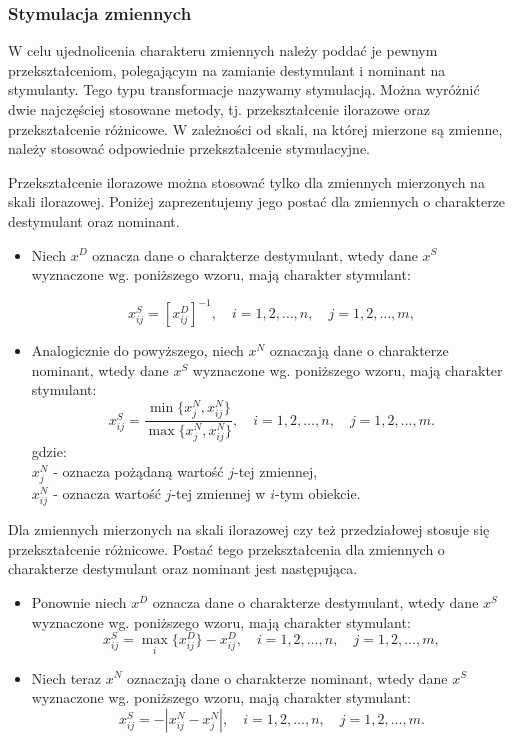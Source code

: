\documentclass[12pt,a4paper]{report}
\begin{document}
\subsubsection{Stymulacja zmiennych}
W celu ujednolicenia charakteru zmiennych należy poddać je pewnym przekształceniom, polegającym na zamianie destymulant i nominant na stymulanty. Tego typu transformacje nazywamy stymulacją. Można wyróżnić dwie najczęściej stosowane metody, tj. przekształcenie ilorazowe oraz przekształcenie różnicowe. W zależności od skali, na której mierzone są zmienne, należy stosować odpowiednie przekształcenie stymulacyjne.

Przekształcenie ilorazowe można stosować tylko dla zmiennych mierzonych na skali ilorazowej. Poniżej zaprezentujemy jego postać dla zmiennych o charakterze destymulant oraz nominant.
\begin{itemize}
\item Niech $x^{D}$ oznacza dane o charakterze destymulant, wtedy dane $x^{S}$ wyznaczone wg. poniższego wzoru, mają charakter stymulant:

$$
x_{ij}^{S}=[x_{ij}^{D}]^{-1},  \quad i = 1,2, \ldots, n, \quad j=1,2,\ldots, m,
$$

\item Analogicznie do powyższego, niech $x^{N}$ oznaczają dane o charakterze nominant, wtedy dane $x^{S}$ wyznaczone wg. poniższego wzoru, mają charakter stymulant:
$$
x_{ij}^{S}=\frac{\min\{x_{j}^{N},x_{ij}^{N}\}}{\max\{x_{j}^{N},x_{ij}^{N}\}}, \quad i = 1,2, \ldots, n, \quad j=1,2,\ldots, m.
$$
gdzie:\\
$x_{j}^{N}$ - oznacza pożądaną wartość $j$-tej zmiennej,\\
$x_{ij}^{N}$ - oznacza wartość $j$-tej zmiennej w $i$-tym obiekcie.
\end{itemize}

Dla zmiennych mierzonych na skali ilorazowej czy też przedziałowej stosuje się przekształcenie różnicowe. Postać tego przekształcenia dla zmiennych o charakterze destymulant oraz nominant jest następująca.
\begin{itemize}

\item Ponownie niech $x^{D}$ oznacza dane o charakterze destymulant, wtedy dane $x^{S}$ wyznaczone wg. poniższego wzoru, mają charakter stymulant:
$$
x_{ij}^{S}=\max\limits_{i} \{x_{ij}^{D}\} - x_{ij}^{D}, \quad i = 1,2, \ldots, n, \quad j=1,2,\ldots, m,
$$
\item Niech teraz $x^{N}$ oznaczają dane o charakterze nominant, wtedy dane $x^{S}$ wyznaczone wg. poniższego wzoru, mają charakter stymulant:
$$
x_{ij}^{S}=-|x_{ij}^{N}-x_{j}^{N}|, \quad i = 1,2, \ldots, n, \quad j=1,2,\ldots, m.
$$
\end{itemize}
\end{document}
